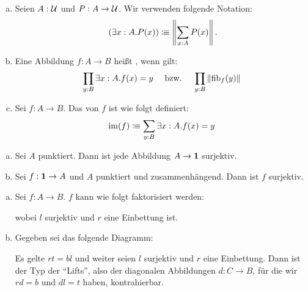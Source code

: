 \begin{definition}
  \begin{enumerate}[(a)]
  \item Seien $A:\mathcal{U}$ und $P:A\to\mathcal{U}$. Wir verwenden folgende Notation\index{$\exists$}:
  \[
    \left(\exists x:A.P(x)\right)\colonequiv \left\|\sum_{x:A}P(x)\right\|\rlap{.}
  \]  
  \item Eine Abbildung $f:A\to B$ heißt , wenn gilt:
  \[
    \prod_{y:B}\exists x:A.f(x)=y\quad\text{ bzw.\ }\quad \prod_{y:B}\|\mathrm{fib}_f(y)\|
  \]
\item Sei $f:A\to B$. Das  von $f$ ist wie folgt definiert\index{$\im$}:
  \[
    \mathrm{im}(f)\vcentcolon\mspace{-1.2mu}\equiv \sum_{y:B}\exists x:A.f(x)=y
  \]
  \end{enumerate}
\end{definition}

\begin{beispiel}
  \begin{enumerate}[(a)]
  \item Sei $A$ punktiert. Dann ist jede Abbildung $A\to \mathbf{1}$ surjektiv.
  \item Sei $f:\mathbf{1}\to A$ und $A$ punktiert und zusammenhängend. Dann ist $f$ surjektiv.
  \end{enumerate}
\end{beispiel}

\begin{lemma}
  \begin{enumerate}[(a)]
  \item Sei $f:A\to B$. $f$ kann wie folgt faktorisiert werden:
  \begin{center}
  \end{center}
  wobei $l$ surjektiv und $r$ eine Einbettung ist.
\item Gegeben sei das folgende Diagramm:
  \begin{center}
  \end{center}
  Es gelte $rt=bl$ und weiter seien $l$ surjektiv und $r$ eine Einbettung.
  Dann ist der Typ der ``Lifts'', also der diagonalen Abbildungen $d:C\to B$, für die wir $rd=b$ und $dl=t$ haben,
  kontrahierbar.
  \end{enumerate}
\end{lemma}

